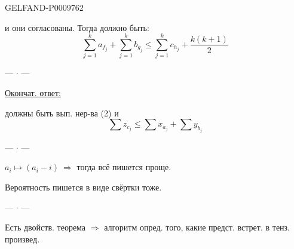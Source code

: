 \begin{GelfandAdjacentEvidence}{GELFAND-P000976}{2}


и они согласованы. Тогда должно быть:
\[
 \sum_{j=1}^{k}a_{f_j}+\sum_{j=1}^{k}b_{g_j}
 \leqslant \sum_{j=1}^{k}c_{h_j}+\frac{k(k+1)}2
\]

\begin{center}--- \(\cdot\) ---\end{center}

\underline{Окончат. ответ:}

должны быть вып. нер-ва (2) и
\begin{equation*}
 \sum z_{c_j}\leqslant\sum x_{a_j}+\sum y_{b_j}
 \tag{5}
\end{equation*}

\begin{center}--- \(\cdot\) ---\end{center}

$a_i\mapsto(a_i-i)\ \Rightarrow$ тогда всё пишется проще.

Вероятность пишется в виде свёртки тоже.

\begin{center}--- \(\cdot\) ---\end{center}

Есть двойств. теорема $\Rightarrow$ алгоритм опред. того, какие предст. встрет. в тенз. произвед.
\end{GelfandAdjacentEvidence}


